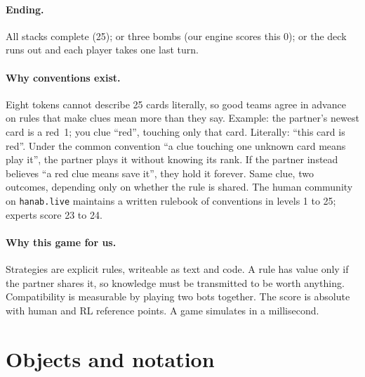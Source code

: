 \documentclass[11pt]{article}
\begin{document}
\paragraph{Ending.} All stacks complete (25); or three bombs (our engine scores this 0); or the deck runs out and
each player takes one last turn.

\paragraph{Why conventions exist.} Eight tokens cannot describe 25 cards literally, so good teams agree in advance on
rules that make clues mean more than they say. Example: the partner's newest card is a red~1; you clue ``red'',
touching only that card. Literally: ``this card is red''. Under the common convention ``a clue touching one unknown
card means play it'', the partner plays it without knowing its rank. If the partner instead believes ``a red clue means
save it'', they hold it forever. Same clue, two outcomes, depending only on whether the rule is shared. The human
community on \texttt{hanab.live} maintains a written rulebook of conventions in levels 1 to 25; experts score 23 to 24.

\paragraph{Why this game for us.} Strategies are explicit rules, writeable as text and code. A rule has value only if
the partner shares it, so knowledge must be transmitted to be worth anything. Compatibility is measurable by playing
two bots together. The score is absolute with human and RL reference points. A game simulates in a millisecond.

\section{Objects and notation}\label{sec:objects}
\end{document}
